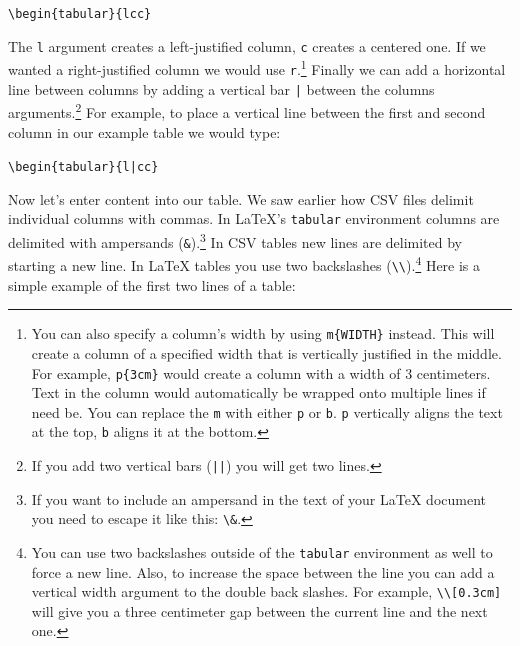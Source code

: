 \begin{knitrout}
\color{fgcolor}\begin{kframe}
\begin{alltt}
\textbackslash{}begin\{tabular\}\{l c c\}
\end{alltt}
\end{kframe}
\end{knitrout}


\noindent The \texttt{l} argument creates a left-justified column, \texttt{c} creates a centered one. If we wanted a right-justified column we would use \texttt{r}.\footnote{You can also specify a column's width by using \texttt{m\{WIDTH\}} instead. This will create a column of a specified width that is vertically justified in the middle. For example, \texttt{p\{3cm\}} would create a column with a width of 3 centimeters. Text in the column would automatically be wrapped onto multiple lines if need be. You can replace the \texttt{m} with either \texttt{p} or \texttt{b}. \texttt{p} vertically aligns the text at the top, \texttt{b} aligns it at the bottom.} Finally we can add a horizontal line between columns by adding a vertical bar \texttt{|} between the columns arguments.\footnote{If you add two vertical bars (\texttt{||}) you will get two lines.} For example, to place a vertical line between the first and second column in our example table we would type:

\begin{knitrout}
\color{fgcolor}\begin{kframe}
\begin{alltt}
\textbackslash{}begin\{tabular\}\{l | c c\}
\end{alltt}
\end{kframe}
\end{knitrout}


Now let's enter content into our table. We saw earlier how CSV files delimit individual columns with commas. In LaTeX's \texttt{tabular} environment columns are delimited with ampersands (\verb|&|).\footnote{If you want to include an ampersand in the text of your LaTeX document you need to escape it like this: \texttt{\textbackslash{}\&}.} In CSV tables new lines are delimited by starting a new line. In LaTeX tables you use two backslashes (\verb|\\|).\footnote{You can use two backslashes outside of the \texttt{tabular} environment as well to force a new line. Also, to increase the space between the line you can add a vertical width argument to the double back slashes. For example, \texttt{\textbackslash{}\textbackslash{}[0.3cm]} will give you a three centimeter gap between the current line and the next one.} Here is a simple example of the first two lines of a table:


